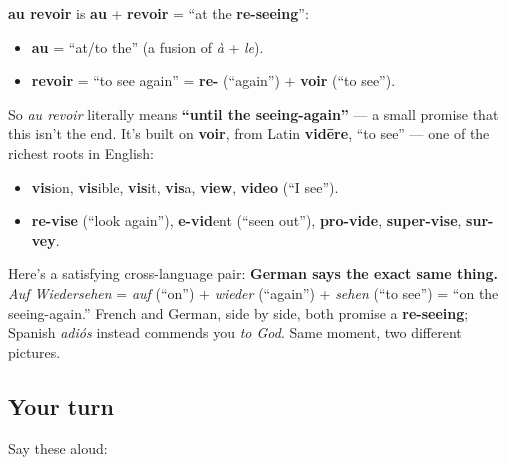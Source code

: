 \begin{cousinweb}
\textbf{au revoir} is \textbf{au} + \textbf{revoir} = \textquotedblleft{}at the \textbf{re-seeing}\textquotedblright{}:

\begin{itemize}
\raggedright
  \item \textbf{au} = \textquotedblleft{}at/to the\textquotedblright{} (a fusion of \emph{à} + \emph{le}).
  \item \textbf{revoir} = \textquotedblleft{}to see again\textquotedblright{} = \textbf{re-} (\textquotedblleft{}again\textquotedblright{}) + \textbf{voir} (\textquotedblleft{}to see\textquotedblright{}).
\end{itemize}

So \emph{au revoir} literally means \textbf{\textquotedblleft{}until the seeing-again\textquotedblright{}} — a small promise that this isn't the end. It's built on \textbf{voir}, from Latin \textbf{vidēre}, \textquotedblleft{}to see\textquotedblright{} — one of the richest roots in English:

\begin{itemize}
\raggedright
  \item \textbf{vis}ion, \textbf{vis}ible, \textbf{vis}it, \textbf{vis}a, \textbf{view}, \textbf{video} (\textquotedblleft{}I see\textquotedblright{}).
  \item \textbf{re-vise} (\textquotedblleft{}look again\textquotedblright{}), \textbf{e-vid}ent (\textquotedblleft{}seen out\textquotedblright{}), \textbf{pro-vide}, \textbf{super-vise}, \textbf{sur-vey}.
\end{itemize}
\end{cousinweb}

\begin{culture}
Here's a satisfying cross-language pair: \textbf{German says the exact same thing.} \emph{Auf Wiedersehen} = \emph{auf} (\textquotedblleft{}on\textquotedblright{}) + \emph{wieder} (\textquotedblleft{}again\textquotedblright{}) + \emph{sehen} (\textquotedblleft{}to see\textquotedblright{}) = \textquotedblleft{}on the seeing-again.\textquotedblright{} French and German, side by side, both promise a \textbf{re-seeing}; Spanish \emph{adiós} instead commends you \emph{to God}. Same moment, two different pictures.
\end{culture}

\subsection*{Your turn}
Say these aloud:

